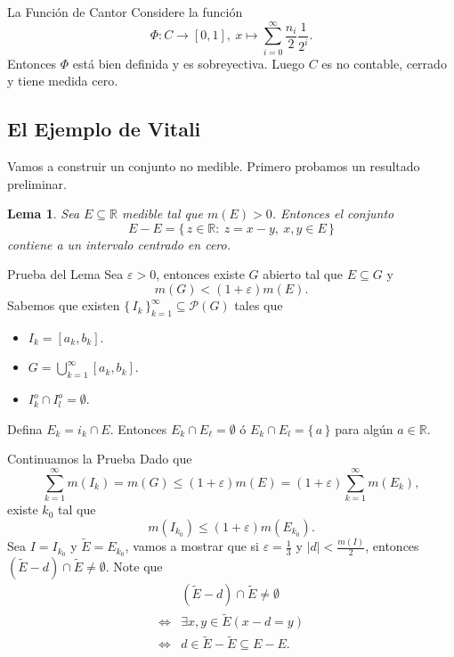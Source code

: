 \documentclass[utf8]{beamer}
\theoremstyle{plain}
\newtheorem{Lem}{Lema}                 %
\theoremstyle{definition}
\theoremstyle{remark}
\numberwithin{equation}{section}
\newcommand{\eps}{\varepsilon}          %
\newcommand{\bR}{\mathbb{R}}    %
\newcommand{\cP}{\mathcal{P}}           %
\newcommand{\bonj}[1]{\left\lbrack#1\right\rbrack}
\newcommand{\set}[1]{\{\,#1\,\}}    %
\renewcommand{\l}{\ell}                   %
\renewcommand{\leq}{\leqslant}          %
\newcommand{\suck}{_{k=1}^\infty} %
\renewcommand{\.}{\Cdot}                %
\begin{document}
\begin{frame}{La Funci\'on de Cantor}
  Considere la funci\'on 
  $$\Phi: C\to\bonj{0,1},\ x\mapsto\sum_{i=0}^\infty\frac{n_i}{2}\frac{1}{2^i}.$$
  Entonces $\Phi$ est\'a bien definida y es sobreyectiva. Luego $C$ es no contable, cerrado y tiene medida cero.
\end{frame}

\subsection{El Ejemplo de Vitali}

\begin{frame}
  Vamos a construir un conjunto no medible. Primero probamos un resultado preliminar.
  \begin{Lem}\label{lem:tecnicoVitali}
    Sea $E\subseteq\bR$ medible tal que $m(E)>0$. Entonces el conjunto 
    $$E-E=\set{z\in\bR:\ z=x-y,\ x,y\in E}$$
    contiene a un intervalo centrado en cero.
  \end{Lem}
\end{frame}

\begin{frame}{Prueba del Lema}
  Sea $\eps>0$, entonces existe $G$ abierto tal que $E\subseteq G$ y $$m(G)<(1+\eps)m(E).$$
  Sabemos que existen $\set{I_k}\suck\subseteq\cP(G)$ tales que 
  \begin{itemize}
    \item $I_k=\bonj{a_k,b_k}$.
    \item $G=\bigcup\suck[a_k,b_k]$.
    \item $I_k^o\cap I_l^o=\emptyset$.
  \end{itemize}
  Defina $E_k=i_k\cap E$. Entonces $E_k\cap E_\l=\emptyset$ \'o $E_k\cap E_l=\set{a}$ para alg\'un $a\in\bR$. 
\end{frame}

\begin{frame}{Continuamos la Prueba}
  Dado que 
  $$\sum\suck m(I_k)=m(G)\leq (1+\eps)m(E)=(1+\eps)\sum\suck m(E_k),$$
  existe $k_0$ tal que 
  $$m(I_{k_0})\leq (1+\eps)m(E_{k_0}).$$
  Sea $I=I_{k_0}$ y $\tilde{E}=E_{k_0}$, vamos a mostrar que si $\eps=\frac{1}{3}$ y $|d|<\frac{m(I)}{2}$, entonces $(\tilde{E}-d)\cap\tilde{E}\neq\emptyset$. Note que 
  \begin{align*}
    &(\tilde{E}-d)\cap\tilde{E}\neq\emptyset\\
    \iff&\exists x,y\in\tilde{E}(x-d=y)\\
    \iff& d\in\tilde{E}-\tilde{E}\subseteq E-E.
  \end{align*}
\end{frame}
\end{document}
